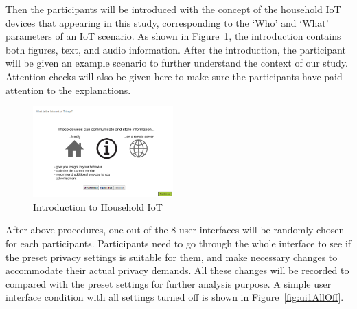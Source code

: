 Then the participants will be introduced with the concept of the household IoT devices that appearing in this study, corresponding to the `Who' and `What' parameters of an IoT scenario. As shown in Figure~\ref{fig:us3}, the introduction contains both figures, text, and audio information. After the introduction, the participant will be given an example scenario to further understand the context of our study. Attention checks will also be given here to make sure the participants have paid attention to the explanations.
\begin{figure}
	\centering
	\includegraphics[width=0.48\textwidth]{figures/userstudy3.png}
	\caption{Introduction to Household IoT}
	\label{fig:us3}
\end{figure}

After above procedures, one out of the 8 user interfaces will be randomly chosen for each participants. Participants need to go through the whole interface to see if the preset privacy settings is suitable for them, and make necessary changes to accommodate their actual privacy demands. All these changes will be recorded to compared with the preset settings for further analysis purpose. A simple user interface condition with all settings turned off is shown in Figure~\ref{fig:ui1AllOff}.

